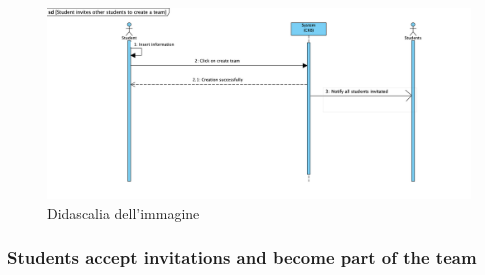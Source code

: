 \begin{figure}[H]
  \includegraphics[width=1\linewidth]{SequenceDiagram/Invite.png} 
  \caption{Didascalia dell'immagine}
  \label{fig:immagine}
\end{figure}


\subsubsection{Students accept invitations and become part of the team}

